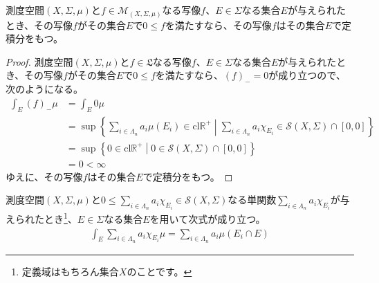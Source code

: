 \documentclass[dvipdfmx]{jsarticle}
\begin{document}
\begin{thm}\label{4.6.1.7}
測度空間$(X,\varSigma,\mu)$と$f \in \mathcal{M}_{(X,\varSigma,\mu)}$なる写像$f$、$E \in \varSigma$なる集合$E$が与えられたとき、その写像$f$がその集合$E$で$0 \leq f$を満たすなら、その写像$f$はその集合$E$で定積分をもつ。
\end{thm}
\begin{proof}
測度空間$(X,\varSigma,\mu)$と$f \in \mathfrak{L}$なる写像$f$、$E \in \varSigma$なる集合$E$が与えられたとき、その写像$f$がその集合$E$で$0 \leq f$を満たすなら、$(f)_{-} = 0$が成り立つので、次のようになる。
\begin{align*}
\int_{E} {(f)_{-}\mu} &= \int_{E} {0\mu}\\
&= \sup\left\{ \sum_{i \in \varLambda_{n}} {a_{i}\mu\left( E_{i} \right)} \in \mathrm{cl}\mathbb{R}^{+} \middle| \sum_{i \in \varLambda_{n}} {a_{i}\chi_{E_{i}}}\in \mathcal{S}(X,\varSigma) \cap [ 0,0] \right\}\\
&= \sup\left\{ 0 \in \mathrm{cl}\mathbb{R}^{+} \middle| 0 \in \mathcal{S}(X,\varSigma) \cap [ 0,0] \right\}\\
&= 0 < \infty
\end{align*}
ゆえに、その写像$f$はその集合$E$で定積分をもつ。
\end{proof}
\begin{thm}\label{4.6.1.8}
測度空間$(X,\varSigma,\mu)$と$0 \leq \sum_{i \in \varLambda_{n}} {a_{i}\chi_{E_{i}}}\in \mathcal{S}(X,\varSigma)$なる単関数$\sum_{i \in \varLambda_{n}} {a_{i}\chi_{E_{i}}}$が与えられたとき\footnote{定義域はもちろん集合$X$のことです。}、$E \in \varSigma$なる集合$E$を用いて次式が成り立つ。
\begin{align*}
\int_{E} {\sum_{i \in \varLambda_{n}} {a_{i}\chi_{E_{i}}}\mu} = \sum_{i \in \varLambda_{n}} {a_{i}\mu\left( E_{i} \cap E \right)}
\end{align*}
\end{thm}
\end{document}
